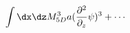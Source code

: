 \begin{equation}
\int \dx \dz M_{5D}^3 a (\frac{\partial^2}{\partial_z} \psi)^3 + \cdots \label{psi3}
\end{equation}

